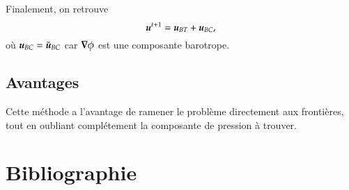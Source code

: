 \documentclass[10pt]{article}
\numberwithin{equation}{section}
\newcommand{\uu}{\vb*{u}}
\begin{document}
Finalement, on retrouve
\begin{equation}
 \uu^{t+1} = \uu_{BT} + \uu_{BC},
\end{equation}
où \(\uu_{BC} = \tilde{\uu}_{BC}\) car \(\gradient{\phi}\) est une composante barotrope.

\subsection{Avantages}
\label{sec:org38fbddc}
Cette méthode a l'avantage de ramener le problème directement aux frontières, tout en oubliant complétement la composante de pression à trouver.

\section{Bibliographie}
\label{sec:org911efac}
\end{document}

